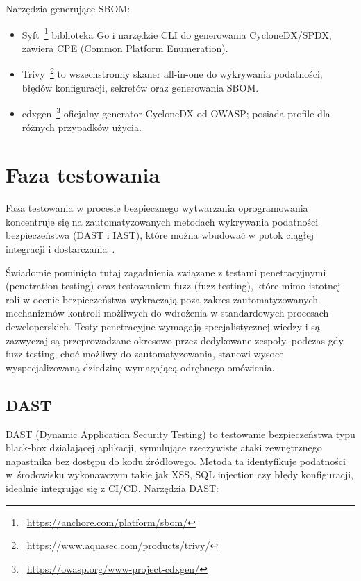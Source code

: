 Narzędzia generujące SBOM:
\begin{itemize}
\item Syft~\footnote{~\url{https://anchore.com/platform/sbom/}} biblioteka Go i narzędzie CLI do generowania CycloneDX/SPDX, zawiera CPE (Common Platform Enumeration).
\item Trivy~\footnote{~\url{https://www.aquasec.com/products/trivy/}} to wszechstronny skaner all-in-one do wykrywania podatności, błędów konfiguracji, sekretów oraz generowania SBOM.
\item cdxgen~\footnote{~\url{https://owasp.org/www-project-cdxgen/}} oficjalny generator CycloneDX od OWASP; posiada profile dla różnych przypadków użycia.
\end{itemize}

\section{Faza testowania}

Faza testowania w procesie bezpiecznego wytwarzania oprogramowania koncentruje się na zautomatyzowanych metodach wykrywania podatności bezpieczeństwa (DAST i IAST), które można wbudować w potok ciągłej integracji i dostarczania~\cite{Abdiukov2024}. 

Świadomie pominięto tutaj zagadnienia związane z testami penetracyjnymi (penetration testing) oraz testowaniem fuzz (fuzz testing), które mimo istotnej roli w ocenie bezpieczeństwa wykraczają poza zakres zautomatyzowanych mechanizmów kontroli możliwych do wdrożenia w standardowych procesach deweloperskich. Testy penetracyjne wymagają specjalistycznej wiedzy i są zazwyczaj są przeprowadzane okresowo przez dedykowane zespoły, podczas gdy fuzz-testing, choć możliwy do zautomatyzowania, stanowi wysoce wyspecjalizowaną dziedzinę wymagającą odrębnego omówienia.

\subsection{DAST}

DAST (Dynamic Application Security Testing) to testowanie bezpieczeństwa typu black-box działającej aplikacji, symulujące rzeczywiste ataki zewnętrznego napastnika bez dostępu do kodu źródłowego. Metoda ta identyfikuje podatności w~środowisku wykonawczym takie jak XSS, SQL injection czy błędy konfiguracji, idealnie integrując się z CI/CD. Narzędzia DAST:


